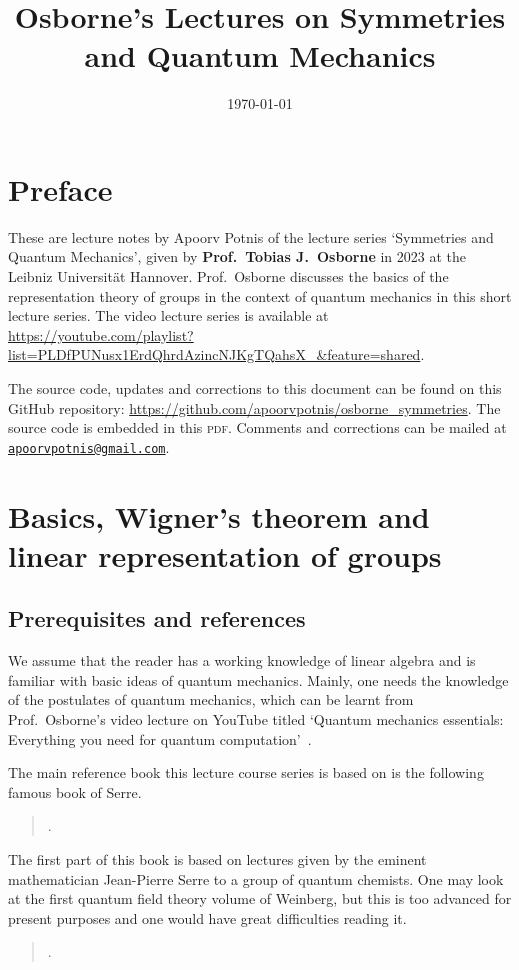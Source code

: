\documentclass[a4 paper, 12pt, oneside]{book}
\title{Osborne's Lectures on Symmetries and Quantum Mechanics}
\author{}
\date{\today}
\theoremstyle{definition}
\begin{document}
	\hypertarget{TitlePage}{}
	\maketitle

	\chapter*{Preface}
	\hypertarget{Preface}{}
	These are lecture notes by Apoorv Potnis of the lecture series `Symmetries and Quantum Mechanics', given by \textbf{Prof.\ Tobias J.\ Osborne} in 2023 at the Leibniz Universität Hannover. Prof.\ Osborne discusses the basics of the representation theory of groups in the context of quantum mechanics in this short lecture series. The video lecture series is available at \url{https://youtube.com/playlist?list=PLDfPUNusx1ErdQhrdAzincNJKgTQahsX_&feature=shared}.

	The source code, updates and corrections to this document can be found on this GitHub repository: \url{https://github.com/apoorvpotnis/osborne_symmetries}. The source code is embedded in this \textsc{pdf}. Comments and corrections can be mailed at \href{mailto:apoorvpotnis@gmail.com}{\texttt{apoorvpotnis@gmail.com}}.
	\clearpage

	\hypertarget{Contents}{}
	\tableofcontents

	\chapter{Basics, Wigner's theorem and linear representation of groups}

	\section{Prerequisites and references}

	We assume that the reader has a working knowledge of linear algebra and is familiar with basic ideas of quantum mechanics. Mainly, one needs the knowledge of the postulates of quantum mechanics, which can be learnt from Prof.\ Osborne's video lecture on YouTube titled `Quantum mechanics essentials: Everything you need for quantum computation'~\cite{Osborne_quantum_essentials}.

	The main reference book this lecture course series is based on is the following famous book of Serre.\begin{quote}.\end{quote}The first part of this book is based on lectures given by the eminent mathematician Jean-Pierre Serre to a group of quantum chemists. One may look at the first quantum field theory volume of Weinberg, but this is too advanced for present purposes and one would have great difficulties reading it.\begin{quote}.\end{quote}
\end{document}
